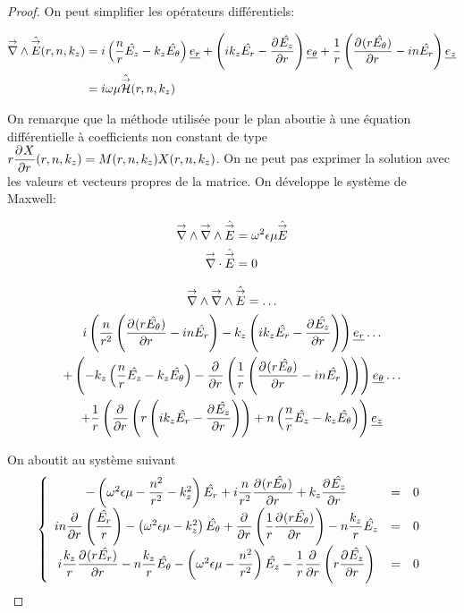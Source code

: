     \begin{proof}

        On peut simplifier les opérateurs différentiels:

        \begin{align}
            \vrot \hat \vE(r,n,k_z) &= i\left(\frac{n}{r}\hat{E_z} - k_z\hat{E_\theta}\right)\v{e_r} + 
            \left(ik_z\hat{E_r} - \ddr{r}{\hat{E_z}}\right)\v{e_\theta} +
            \frac{1}{r}\left(\ddr{r}{(r\hat{E_\theta})}-in\hat{E_r}\right)\v{e_z}
            \\
            &=i\w\mu \hat \vH(r,n,k_z)
        \end{align}

        On remarque que la méthode utilisée pour le plan aboutie à une équation différentielle à coefficients non constant de type \(r\ddr{r}{X}(r,n,k_z) = M(r,n,k_z)X(r,n,k_z)\).
        On ne peut pas exprimer la solution avec les valeurs et vecteurs propres de la matrice. 
        On développe le système de Maxwell:

        \begin{align}
            \vrot \vrot \hat \vE &= \w^2\eps\mu \hat \vE
            \\
            \vdiv \hat \vE &= 0
        \end{align}

        \begin{multline}
            \vrot \vrot \hat \vE = \dots\\
            i\left(\frac{n}{r^2}\left(\ddr{r}{(r\hat{E_\theta})} - in\hat{E_r}\right) - k_z\left(ik_z\hat{E_r} - \ddr{r}{\hat{E_z}}\right)\right)    \v{e_r} \dots\\ 
            + \left(-k_z\left(\frac{n}{r}\hat{E_z} - k_z\hat{E_\theta}\right) -\ddr{r}{}\left(\frac{1}{r}\left(\ddr{r}{(r\hat{E_\theta})}-in\hat{E_r}\right)\right)\right)    \v{e_\theta} \dots\\
            + \frac{1}{r}\left(\ddr{r}{} \left(r\left(ik_z\hat{E_r} - \ddr{r}{\hat{E_z}}\right)\right) + n \left(\frac{n}{r}\hat{E_z} - k_z\hat{E_\theta}\right)\right) \v{e_z}
        \end{multline}

        On aboutit au système suivant
        \begin{equation}
            \left\lbrace
            \begin{array}{ccc}
                -\left(\w^2\eps\mu -\frac{n^2}{r^2}  - k_z^2\right)\hat{E_r}  +i\frac{n}{r^2}\ddr{r}{(r\hat{E_\theta})}  +k_z\ddr{r}{\hat{E_z}} & = & 0\\
                in\ddr{r}{}\left(\frac{\hat{E_r}}{r}\right) -\left(\w^2\eps\mu - k_z^2\right)\hat{E_\theta} + \ddr{r}{}\left(\frac{1}{r}\ddr{r}{(r\hat{E_\theta})}\right)  - n\frac{k_z}{r}\hat{E_z} & = & 0\\
                i\frac{k_z}{r}\ddr{r}{(r\hat{E_r})}  - n\frac{k_z}{r}\hat{E_\theta}  -\left(\w^2\eps\mu - \frac{n^2}{r^2} \right)\hat{E_z} - \frac{1}{r}\ddr{r}{}\left(r\ddr{r}{\hat{E_z}}\right) & = & 0
            \end{array}
            \right.
        \end{equation}


\end{proof}
